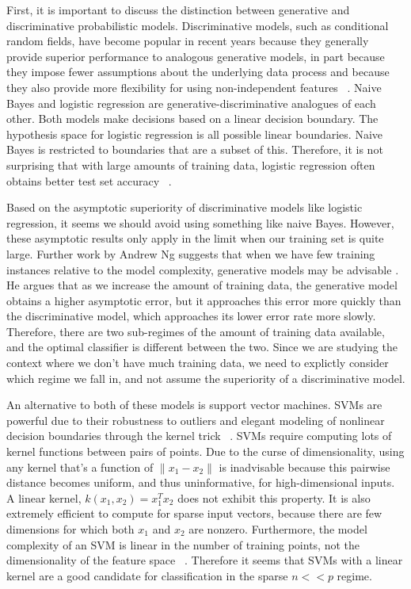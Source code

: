 \documentclass[]{article}
\begin{document}
	First, it is important to discuss the distinction between generative and discriminative probabilistic models. Discriminative models, such as conditional random fields, have become popular in recent years because they generally provide superior performance to analogous generative models, in part because they impose fewer assumptions about the underlying data process and because they also provide more flexibility for using non-independent features ~\cite{lafferty2001conditional}. Naive Bayes and logistic regression are generative-discriminative analogues of each other. Both models make decisions based on a linear decision boundary. The hypothesis space for logistic regression is all possible linear boundaries. Naive Bayes is restricted to boundaries that are a subset of this. Therefore, it is not surprising that with large amounts of training data, logistic regression often obtains better test set accuracy ~\cite{jordan2002discriminative}. 	
	
	Based on the asymptotic superiority of discriminative models like logistic regression, it seems we should avoid using something like naive Bayes. However, these asymptotic results only apply in the limit when our training set is quite large.  Further work by Andrew Ng suggests that when we have few training instances relative to the model complexity, generative models may be advisable \cite{jordan2002discriminative}. He argues that as we increase the amount of training data, the generative model obtains a higher asymptotic error, but it approaches this error more quickly than the discriminative model, which approaches its lower error rate more slowly. Therefore, there are two sub-regimes of the amount of training data available, and  the optimal classifier is different  between the two. Since we are studying the context where we don't have much training data, we need to explictly consider which regime we fall in, and not assume the superiority of a discriminative model.
	
	An alternative to both of these models is support vector machines. SVMs are powerful due to their robustness to outliers and elegant modeling of nonlinear decision boundaries through the kernel trick ~\cite{LectureSVM}. SVMs require computing lots of kernel functions between pairs of points. Due to the curse of dimensionality, using any kernel that's a function of $\lVert x_1 - x_2 \rVert$ is inadvisable because this pairwise distance becomes uniform, and thus uninformative, for high-dimensional inputs. A linear kernel, $k(x_1,x_2) = x_1^Tx_2$ does not exhibit this property. It is also extremely efficient to compute for sparse input vectors, because there are few dimensions for which both $x_1$ and $x_2$ are nonzero. Furthermore, the model complexity of an SVM is linear in the number of training points, not the dimensionality of the feature space ~\cite{LectureSVM}. Therefore it seems that SVMs with a linear kernel are a good candidate for classification in the sparse $n << p$ regime. 
\end{document}
